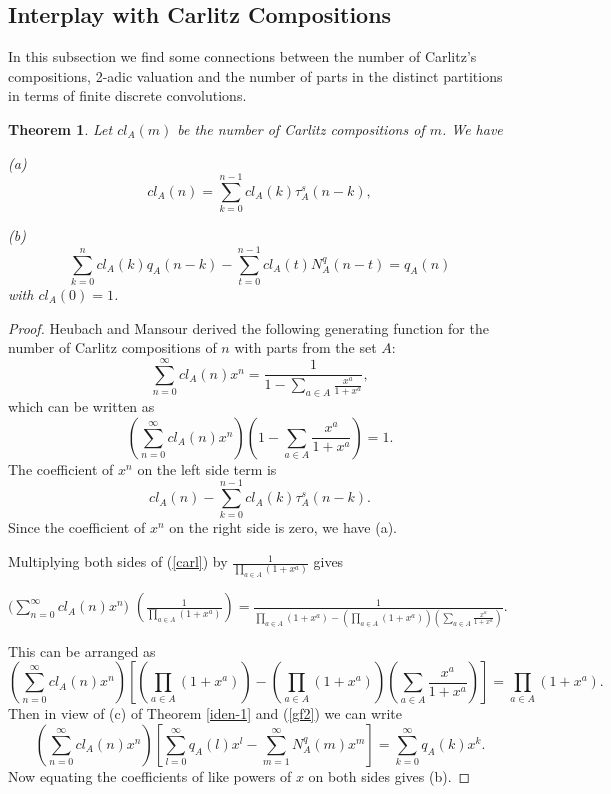 \documentclass[11pt]{article}
\newtheorem{theorem}{Theorem}
\begin{document}
\subsection{ Interplay with Carlitz Compositions}
In this subsection we find some connections between the number of Carlitz's compositions, 2-adic valuation and the number of parts in the distinct partitions  in terms of finite discrete convolutions.
\begin{theorem}\label{iden-5}
Let $cl_A(m)$ be the number of Carlitz compositions of $m$. We have
\begin{description}
\item{(a)}
\begin{equation}
cl_A(n)=\sum_{k=0}^{n-1}cl_A(k)\tau_A^s(n-k),
\end{equation}
\item{(b)}
\begin{equation}
\sum_{k=0}^{n}cl_A(k)q_A(n-k)-\sum_{t=0}^{n-1}cl_A(t)N^q_A(n-t)=q_A(n)
\end{equation}
with $cl_A(0)=1$.
\end{description}
\end{theorem}
\begin{proof}
Heubach and Mansour \cite{heubach} derived the following generating function for the number of Carlitz compositions of $n$ with parts from the set $A$:
\begin{equation}\label{carl}
\sum_{n=0}^{\infty}cl_A(n)x^n=\frac{1}{1-\sum_{a\in A}\frac{x^a}{1+x^a}},
\end{equation}
which can be written as
\[\left(\sum_{n=0}^{\infty}cl_A(n)x^n\right)\left(1-\sum_{a\in A}\frac{x^a}{1+x^a}\right)=1.
\]
The coefficient of $x^n$ on the left side term is 
\[cl_A(n)-\sum_{k=0}^{n-1}cl_A(k)\tau_A^s(n-k).
\]
Since the coefficient of $x^n$ on the right side is zero, we have (a).

Multiplying both sides of (\ref{carl}) by $\frac{1}{\prod_{a\in A}(1+x^a)}$ gives
\begin{center}
 $\Big(\sum_{n=0}^{\infty}cl_A(n)x^n\Big)$ $\left(\frac{1}{\prod_{a\in A}(1+x^a)}\right)=\frac{1}{\prod_{a\in A}(1+x^a)-\left(\prod_{a\in A}(1+x^a)\right)\left(\sum_{a\in A}\frac{x^a}{1+x^a}\right)}.$
\end{center}
This can be arranged as
\[\left(\sum_{n=0}^{\infty}cl_A(n)x^n\right)\left[\left(\prod_{a\in A}(1+x^a)\right)-\left(\prod_{a\in A}(1+x^a)\right)\left(\sum_{a\in A}\frac{x^a}{1+x^a}\right)\right]=\prod_{a\in A}(1+x^a).
\]
Then in view of (c) of Theorem \ref{iden-1} and (\ref{gf2}) we can write
\[\left(\sum_{n=0}^{\infty}cl_A(n)x^n\right)\left[\sum_{l=0}^{\infty}q_A(l)x^l-\sum_{m=1}^{\infty}N^q_A(m)x^m\right]=\sum_{k=0}^{\infty}q_A(k)x^k.
\]
Now equating the coefficients of like powers of $x$ on both sides gives (b).
\end{proof}
\end{document}
